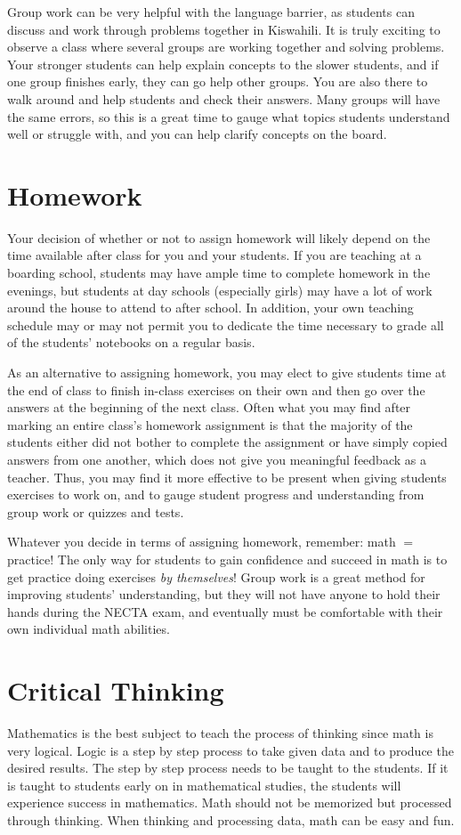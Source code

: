 Group work can be very helpful with the language barrier, as students can discuss and work through problems together in Kiswahili. It is truly exciting to observe a class where several groups are working together and solving problems. Your stronger students can help explain concepts to the slower students, and if one group finishes early, they can go help other groups. You are also there to walk around and help students and check their answers. Many groups will have the same errors, so this is a great time to gauge what topics students understand well or struggle with, and you can help clarify concepts on the board.
\section{Homework}
Your decision of whether or not to assign homework will likely depend on the time available after class for you and your students. If you are teaching at a boarding school, students may have ample time to complete homework in the evenings, but students at day schools (especially girls) may have a lot of work around the house to attend to after school. In addition, your own teaching schedule may or may not permit you to dedicate the time necessary to grade all of the students' notebooks on a regular basis.

As an alternative to assigning homework, you may elect to give students time at the end of class to finish in-class exercises on their own and then go over the answers at the beginning of the next class. Often what you may find after marking an entire class's homework assignment is that the majority of the students either did not bother to complete the assignment or have simply copied answers from one another, which does not give you meaningful feedback as a teacher. Thus, you may find it more effective to be present when giving students exercises to work on, and to gauge student progress and understanding from group work or quizzes and tests.

Whatever you decide in terms of assigning homework, remember: math $=$ practice! The only way for students to gain confidence and succeed in math is to get practice doing exercises \textit{by themselves}! Group work is a great method for improving students' understanding, but they will not have anyone to hold their hands during the NECTA exam, and eventually must be comfortable with their own individual math abilities.

\section{Critical Thinking}
Mathematics is the best subject to teach the process of thinking since math is very logical. Logic is a step
by step process to take given data and to produce the desired results. The step by step process needs to be
taught to the students. If it is taught to students early on in mathematical studies, the students will experience
success in mathematics. Math should not be memorized but processed through thinking. When thinking and processing data, math can be easy and fun.

